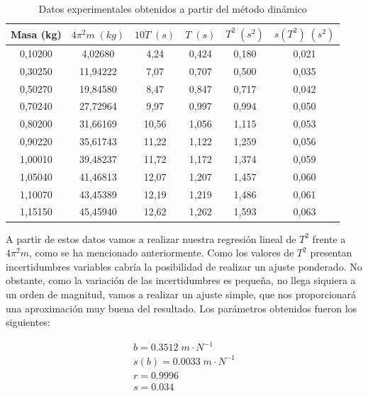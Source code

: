 \documentclass[a4paper,12pt,titlepage]{report}
\begin{document}
\newpage

\begin{table}[h!]
    \centering
    \begin{tabular}{|c|c|c|c|c|c|}
    \hline
    Masa (kg) & $4\pi^2m \; (kg)$ & $10T \; (s)$ & $T \; (s)$ & $T^2 \; (s^2) $&   $s(T^2) \; (s^2)$\\ \hline
    0,10200 & 4,02680  & 4,24  & 0,424 & 0,180 & 0,021 \\ \hline
    0,30250 & 11,94222 & 7,07  & 0,707 & 0,500 & 0,035 \\ \hline
    0,50270 & 19,84580 & 8,47  & 0,847 & 0,717 & 0,042 \\ \hline
    0,70240 & 27,72964 & 9,97  & 0,997 & 0,994 & 0,050 \\ \hline
    0,80200 & 31,66169 & 10,56 & 1,056 & 1,115 & 0,053 \\ \hline
    0,90220 & 35,61743 & 11,22 & 1,122 & 1,259 & 0,056 \\ \hline
    1,00010 & 39,48237 & 11,72 & 1,172 & 1,374 & 0,059 \\ \hline
    1,05040 & 41,46813 & 12,07 & 1,207 & 1,457 & 0,060 \\ \hline
    1,10070 & 43,45389 & 12,19 & 1,219 & 1,486 & 0,061 \\ \hline
    1,15150 & 45,45940 & 12,62 & 1,262 & 1,593 & 0,063 \\ \hline
    \end{tabular}
    \caption{Datos experimentales obtenidos a partir del método dinámico}
    \label{Datos dinamico}
    \end{table}

A partir de estos datos vamos a realizar nuestra regresión lineal de $T^2$ frente a $4\pi^2m$, como se ha mencionado anteriormente. Como los valores de $T^2$ presentan incertidumbres variables cabría la posibilidad de realizar un ajuste ponderado. No obstante, como la variación de las incertidumbres es pequeña, no llega siquiera a un orden de magnitud, vamos a realizar un ajuste simple, que nos proporcionará una aproximación muy buena del resultado. Los parámetros obtenidos fueron los siguientes:

\begin{equation}
    \begin{gathered}
        b = 0.3512 \; m\cdot N^{-1}\\
        s(b) = 0.0033 \; m\cdot N^{-1}\\
        r =  0.9996 \\
        s =  0.034
    \end{gathered}
\end{equation}
\end{document}
